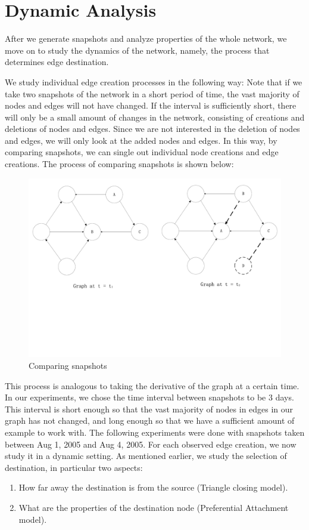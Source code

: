 \documentclass[10pt,twocolumn]{article}
\begin{document}
\section{Dynamic Analysis}
After we generate snapshots and analyze properties of the whole network, we move on to study the dynamics of the network, namely, the process that determines edge destination.

We study individual edge creation processes in the following way: Note that if we take two snapshots of the network in a short period of time, the vast majority of nodes and edges will not have changed. If the interval is sufficiently short, there will only be a small amount of changes in the network, consisting of creations and deletions of nodes and edges. Since we are not interested in the deletion of nodes and edges, we will only look at the added nodes and edges. In this way, by comparing snapshots, we can single out individual node creations and edge creations. The process of comparing snapshots is shown below:
\begin{figure}[ht]
    \centering
        \includegraphics[scale = 0.25, trim = 0cm 8cm 0cm 0cm]{./graphs/dynamic.pdf}
    \caption{Comparing snapshots} \label{fig:compare}
\end{figure}

This process is analogous to taking the derivative of the graph at a certain time. In our experiments, we chose the time interval between snapshots to be 3 days. This interval is short enough so that the vast majority of nodes in edges in our graph has not changed, and long enough so that we have a sufficient amount of example to work with. The following experiments were done with snapshots taken between Aug 1, 2005 and Aug 4, 2005.
For each observed edge creation, we now study it in a dynamic setting. As mentioned earlier, we study the selection of destination, in particular two aspects:
\begin{enumerate}
\item How far away the destination is from the source (Triangle closing model).
\item What are the properties of the destination node (Preferential Attachment model).
\end{enumerate}
\end{document}
